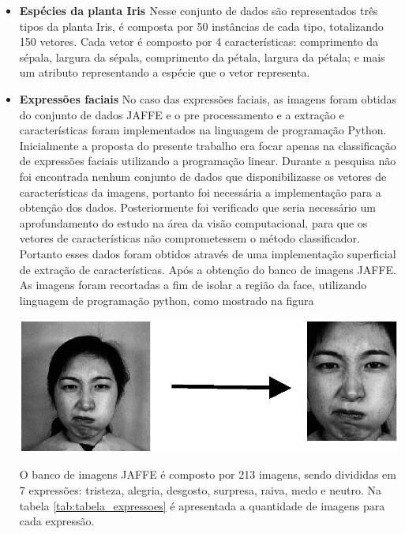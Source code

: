 \begin{itemize}
\item \textbf{Espécies da planta Iris \cite{Iris}}
Nesse conjunto de dados são representados três tipos da planta Iris, é composta por 50 instâncias de cada tipo, totalizando 150 vetores. Cada vetor é composto por 4 características: comprimento da sépala, largura da sépala, comprimento da pétala, largura da pétala; e mais um atributo representando a espécie que o vetor representa.

\item \textbf{Expressões faciais}
No caso das expressões faciais, as imagens foram obtidas do conjunto de dados JAFFE \cite{Jaffe} e o pre processamento e a extração e características foram implementados na linguagem de programação Python.
Inicialmente a proposta do presente trabalho era focar apenas na classificação de expressões faciais utilizando a programação linear. Durante a pesquisa não foi encontrada nenhum conjunto de dados que disponibilizasse os vetores de características da imagens, portanto foi necessária a implementação para a obtenção dos dados. Posteriormente foi verificado que seria necessário um aprofundamento do estudo na área da visão computacional, para que os vetores de características não comprometessem o método classificador. Portanto esses dados foram obtidos através de uma implementação superficial de extração de características.
Após a obtenção do banco de imagens JAFFE. As imagens foram recortadas a fim de isolar a região da face, utilizando linguagem de programação python, como mostrado na figura

\begin{center}
	\includegraphics[scale=0.5]{graficos/jaffe}
	\label{img:jaffe}
\end{center}

O banco de imagens JAFFE é composto por 213 imagens, sendo divididas em 7 expressões: tristeza, alegria, desgosto, surpresa, raiva, medo e neutro. Na tabela \ref{tab:tabela_expressoes} é apresentada a quantidade de imagens para cada expressão.


\end{itemize}
